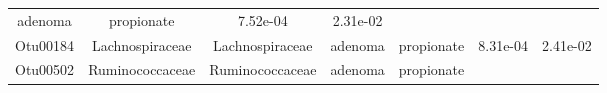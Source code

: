 \documentclass[11pt,]{article}
\begin{document}
\begin{longtable}[]{@{}ccccccc@{}}
\begin{minipage}[t]{0.09\columnwidth}
adenoma\strut
\end{minipage} & \begin{minipage}[t]{0.11\columnwidth}\centering\strut
propionate\strut
\end{minipage} & \begin{minipage}[t]{0.09\columnwidth}\centering\strut
7.52e-04\strut
\end{minipage} & \begin{minipage}[t]{0.09\columnwidth}\centering\strut
2.31e-02\strut
\end{minipage}\tabularnewline
\begin{minipage}[t]{0.09\columnwidth}\centering\strut
Otu00184\strut
\end{minipage} & \begin{minipage}[t]{0.17\columnwidth}\centering\strut
Lachnospiraceae\strut
\end{minipage} & \begin{minipage}[t]{0.17\columnwidth}\centering\strut
Lachnospiraceae\strut
\end{minipage} & \begin{minipage}[t]{0.09\columnwidth}\centering\strut
adenoma\strut
\end{minipage} & \begin{minipage}[t]{0.11\columnwidth}\centering\strut
propionate\strut
\end{minipage} & \begin{minipage}[t]{0.09\columnwidth}\centering\strut
8.31e-04\strut
\end{minipage} & \begin{minipage}[t]{0.09\columnwidth}\centering\strut
2.41e-02\strut
\end{minipage}\tabularnewline
\begin{minipage}[t]{0.09\columnwidth}\centering\strut
Otu00502\strut
\end{minipage} & \begin{minipage}[t]{0.17\columnwidth}\centering\strut
Ruminococcaceae\strut
\end{minipage} & \begin{minipage}[t]{0.17\columnwidth}\centering\strut
Ruminococcaceae\strut
\end{minipage} & \begin{minipage}[t]{0.09\columnwidth}\centering\strut
adenoma\strut
\end{minipage} & \begin{minipage}[t]{0.11\columnwidth}\centering\strut
propionate\strut
\end{minipage} & \begin{minipage}[t]{0.09\columnwidth}\centering\strut

\end{minipage}
\end{longtable}
\end{document}
